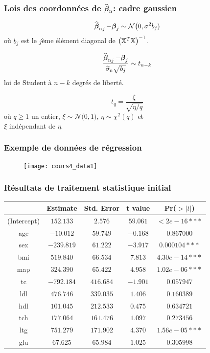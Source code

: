 \begin{frame}
\frametitle{Lois des coordonnées de $\operatorname{\widehat{\boldsymbol{\beta}}_n}$: cadre gaussien}
$$
\operatorname{\widehat{\boldsymbol{\beta}}_n}_j -\boldsymbol{\beta}_j \sim {\mathcal N}\big(0, \sigma^2 b_j)
$$
o\`u $b_j$ est le $j$ème élément diagonal de $\big(\mathbb{X}^T
\mathbb{X}\big)^{-1}$. 

$$ \frac{\operatorname{\widehat{\boldsymbol{\beta}}_n}_j -\boldsymbol{\beta}_j}{\widehat \sigma_n \sqrt{b_j}} \sim t_{n-k}$$ 
\alert{loi de Student \`a $n-k$ degrés de liberté}.

$$ t_q = \frac{\xi}{\sqrt{\eta/q}}$$
o\`u $q\ge 1$ un entier, $\xi\sim {\mathcal N}\big(0,1)$, $\eta\sim
\chi^2(q)$ et\\ $\xi$ \alert{indépendant} de $\eta$.
\end{frame}

\begin{frame}
    \frametitle{Exemple de données de régression}
\begin{figure}
\texttt{[image: cours4\_data1]}
\end{figure}
\end{frame}

\begin{frame}
\frametitle{Résultats de traitement statistique initial}
\begin{tabular}{|c||c|c|c|c|}
\hline &Estimate&Std. Error&t value&Pr($>|t|$)\\\hline
(Intercept) &$152.133$&$2.576$&$59.061$&$< 2e-16***$\\
age&$-10.012$&$59.749$&$ -0.168$&$0.867000$\\\hline
sex &$-239.819$&$61.222$&$-3.917$&$0.000104***$\\
bmi&$519.840$&$66.534$&$7.813$&$4.30e-14***$\\\hline
map&$324.390$&$65.422$&$4.958$&$1.02e-06***$\\
tc&$-792.184$&$416.684$&$-1.901$&$0.057947$\\\hline
ldl&$476.746$&$339.035$&$1.406$&$0.160389$\\
hdl&$101.045$&$212.533 $&$0.475$&$0.634721$\\\hline
tch&$177.064$&$161.476$&$ 1.097$&$0.273456$\\
ltg&$751.279$&$ 171.902$&$4.370$&$ 1.56e-05***$\\\hline
glu&$67.625$&$ 65.984$&$1.025$&$0.305998$\\\hline
\end{tabular}
\end{frame}

